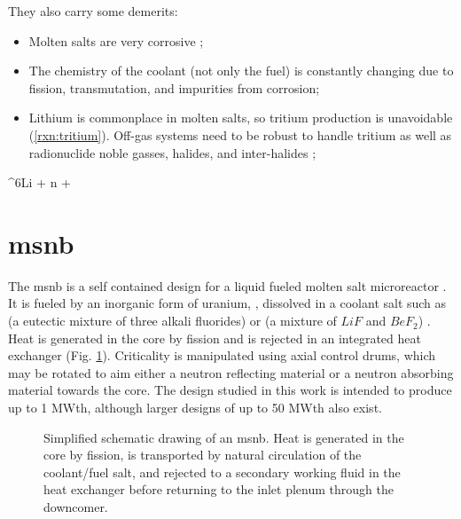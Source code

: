 They also carry some demerits:
\begin{itemize}
    \item Molten salts are very corrosive \cite{RoperRedox};
    \item The chemistry of the coolant (not only the fuel) is constantly changing due to fission, transmutation, and impurities from corrosion;
    \item Lithium is commonplace in molten salts, so tritium production is unavoidable (\ref{rxn:tritium}). Off-gas systems need to be robust to handle tritium as well as radionuclide noble gasses, halides, and inter-halides \cite{HolcombOffgas};
\end{itemize}

\begin{reaction} \label{rxn:tritium}
    ^{6}Li + n  + \alpha
\end{reaction}

\section{\texorpdfstring{\acl{msnb}}{Molten Salt Nuclear Battery}}
The \acf{msnb} is a self contained design for a liquid fueled molten salt microreactor \cite{CarterPHD,PetersonMS}. It is fueled by an inorganic form of uranium, \UF, dissolved in a coolant salt such as \flinak (a eutectic mixture of three alkali fluorides) or \flibe  (a mixture of $LiF$ and $BeF_2$) \cite{RoperOverview}. Heat is generated in the core by fission and is rejected in an integrated heat exchanger (Fig. \ref{fig:tikz_msnb}). Criticality is manipulated using axial control drums, which may be rotated to aim either a neutron reflecting material or a neutron absorbing material towards the core. The design studied in this work is intended to produce up to 1 MWth, although larger designs of up to 50 MWth also exist.

\begin{figure}[h!]
    \centering
    
    \caption[Simplified schematic drawing of an \acs{msnb}]{Simplified schematic drawing of an \acs{msnb}. Heat is generated in the core by fission, is transported by natural circulation of the coolant/fuel salt, and rejected to a secondary working fluid in the heat exchanger before returning to the inlet plenum through the downcomer.}
    \label{fig:tikz_msnb}
\end{figure}

